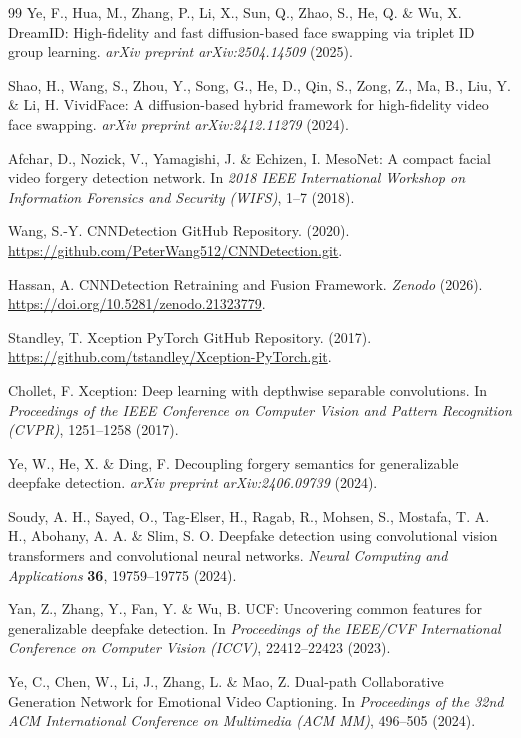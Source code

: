 \documentclass[fleqn,10pt]{wlscirep}
\begin{document}
\begin{thebibliography}{99}
 Ye, F., Hua, M., Zhang, P., Li, X., Sun, Q., Zhao, S., He, Q. \& Wu, X. DreamID: High-fidelity and fast diffusion-based face swapping via triplet ID group learning. \textit{arXiv preprint arXiv:2504.14509} (2025).

 Shao, H., Wang, S., Zhou, Y., Song, G., He, D., Qin, S., Zong, Z., Ma, B., Liu, Y. \& Li, H. VividFace: A diffusion-based hybrid framework for high-fidelity video face swapping. \textit{arXiv preprint arXiv:2412.11279} (2024).

 Afchar, D., Nozick, V., Yamagishi, J. \& Echizen, I. MesoNet: A compact facial video forgery detection network. In \textit{2018 IEEE International Workshop on Information Forensics and Security (WIFS)}, 1--7 (2018).

 Wang, S.-Y. CNNDetection GitHub Repository. (2020). \url{https://github.com/PeterWang512/CNNDetection.git}.

 Hassan, A. CNNDetection Retraining and Fusion Framework. \textit{Zenodo} (2026). \url{https://doi.org/10.5281/zenodo.21323779}.

 Standley, T. Xception PyTorch GitHub Repository. (2017). \url{https://github.com/tstandley/Xception-PyTorch.git}.

 Chollet, F. Xception: Deep learning with depthwise separable convolutions. In \textit{Proceedings of the IEEE Conference on Computer Vision and Pattern Recognition (CVPR)}, 1251--1258 (2017).

 Ye, W., He, X. \& Ding, F. Decoupling forgery semantics for generalizable deepfake detection. \textit{arXiv preprint arXiv:2406.09739} (2024).

 Soudy, A. H., Sayed, O., Tag-Elser, H., Ragab, R., Mohsen, S., Mostafa, T. A. H., Abohany, A. A. \& Slim, S. O. Deepfake detection using convolutional vision transformers and convolutional neural networks. \textit{Neural Computing and Applications} \textbf{36}, 19759--19775 (2024).

 Yan, Z., Zhang, Y., Fan, Y. \& Wu, B. UCF: Uncovering common features for generalizable deepfake detection. In \textit{Proceedings of the IEEE/CVF International Conference on Computer Vision (ICCV)}, 22412--22423 (2023).

 Ye, C., Chen, W., Li, J., Zhang, L. \& Mao, Z. Dual-path Collaborative Generation Network for Emotional Video Captioning. In \textit{Proceedings of the 32nd ACM International Conference on Multimedia (ACM MM)}, 496--505 (2024).


\end{thebibliography}
\end{document}
